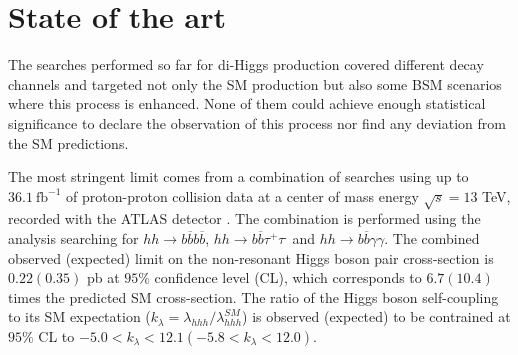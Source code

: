 
\section{State of the art}
\label{sec:backg}


The searches performed so far for di-Higgs production covered different decay channels and targeted not only the SM production but also some BSM scenarios where this process is enhanced. None of them could achieve enough statistical significance to declare the observation of this process nor find any deviation from the SM predictions. 

The most stringent limit comes from a combination of searches using up to $36.1~\text{fb}^{-1}$ of proton-proton collision data at a center of mass energy $\sqrt{s}=13$ TeV, recorded with the ATLAS detector \cite{ATLAShhComb}. The combination is performed using the analysis searching for $hh\rightarrow b\overline{b}b\overline{b}$, $hh\rightarrow b\overline{b}\tau^+\tau^.$ and $hh\rightarrow b\overline{b}\gamma\gamma$. The combined observed (expected) limit on the non-resonant Higgs boson pair cross-section is $0.22(0.35)$ pb at $95\%$ confidence level (CL), which corresponds to $6.7 (10.4)$ times the predicted SM cross-section. The ratio of the Higgs boson self-coupling to its SM expectation ($k_{\lambda}=\lambda_{hhh}/\lambda_{hhh}^{SM}$) is observed (expected) to be contrained at $95\%$ CL to $-5.0<k_{\lambda}<12.1 (-5.8<k_{\lambda}<12.0)$. 

